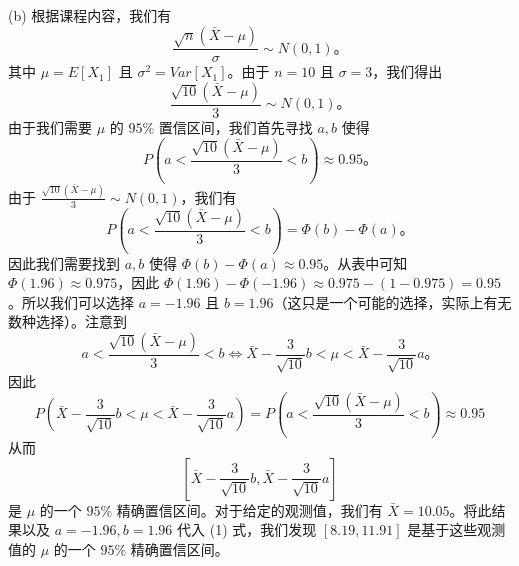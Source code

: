 \begin{questions}
\begin{solution}
(b) 根据课程内容，我们有
\[
\frac{\sqrt{n}(\bar{X} - \mu)}{\sigma} \sim N(0,1)。
\]
其中 $\mu = E[X_1]$ 且 $\sigma^2 = Var[X_1]$。由于 $n = 10$ 且 $\sigma = 3$，我们得出
\[
\frac{\sqrt{10}(\bar{X} - \mu)}{3} \sim N(0,1)。
\]
由于我们需要 $\mu$ 的 $95\%$ 置信区间，我们首先寻找 $a, b$ 使得
\[
P\left( a < \frac{\sqrt{10}(\bar{X} - \mu)}{3} < b \right) \approx 0.95。
\]
由于 $\frac{\sqrt{10}(\bar{X} - \mu)}{3} \sim N(0,1)$，我们有
\[
P\left( a < \frac{\sqrt{10}(\bar{X} - \mu)}{3} < b \right) = \Phi(b) - \Phi(a)。
\]
因此我们需要找到 $a, b$ 使得 $\Phi(b) - \Phi(a) \approx 0.95$。从表中可知 $\Phi(1.96) \approx 0.975$，因此 $\Phi(1.96) - \Phi(-1.96) \approx 0.975 - (1 - 0.975) = 0.95$。所以我们可以选择 $a = -1.96$ 且 $b = 1.96$（这只是一个可能的选择，实际上有无数种选择）。注意到
\[
a < \frac{\sqrt{10}(\bar{X} - \mu)}{3} < b \iff \bar{X} - \frac{3}{\sqrt{10}}b < \mu < \bar{X} - \frac{3}{\sqrt{10}}a。
\]
因此
\[
P\left( \bar{X} - \frac{3}{\sqrt{10}}b < \mu < \bar{X} - \frac{3}{\sqrt{10}}a \right) = P\left( a < \frac{\sqrt{10}(\bar{X} - \mu)}{3} < b \right) \approx 0.95
\]
从而
\begin{equation}
\left[ \bar{X} - \frac{3}{\sqrt{10}}b, \bar{X} - \frac{3}{\sqrt{10}}a \right]
\end{equation}
是 $\mu$ 的一个 $95\%$ 精确置信区间。对于给定的观测值，我们有 $\bar{X} = 10.05$。将此结果以及 $a = -1.96, b = 1.96$ 代入 (1) 式，我们发现 $[8.19, 11.91]$ 是基于这些观测值的 $\mu$ 的一个 $95\%$ 精确置信区间。
\end{solution}
\end{questions}
\pagebreak

